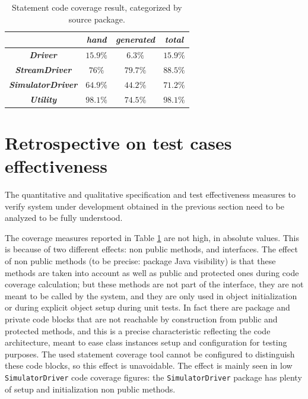\documentclass{article} \usepackage{times}
\newcommand{\lil}[1]{\texttt{\lstinline|#1|}}
\begin{document}
\begin{table}[htbp]
  \caption{Statement code coverage result, categorized by source package.}
  \label{tab:statement_code_coverage}
  \begin{center}
    \begin{tabular}{|c|c|c|c|}\hline
      & \textbf{\textit{hand}} & \textbf{\textit{generated}} &
      \textbf{\textit{total}} \\\hline
      \textbf{\textit{Driver}} & $15.9 \%$ & $6.3 \%$ & $15.9 \%$ \\\hline
      \textbf{\textit{StreamDriver}} & $76 \%$ & $79.7 \%$ & $88.5 \%$ \\\hline
      \textbf{\textit{SimulatorDriver}} & $64.9 \%$ & $44.2 \%$ &
      $71.2 \%$ \\\hline
      \textbf{\textit{Utility}} & $98.1 \%$ & $74.5 \%$ & $98.1 \%$ \\\hline
    \end{tabular}
  \end{center}
\end{table}



\section{Retrospective on test cases effectiveness}
\label{sec:test_cases_retrospectives}

The quantitative and qualitative specification and test effectiveness
measures to verify system under development obtained
in the previous section need to be analyzed to be fully understood.

The coverage measures reported in Table
\ref{tab:statement_code_coverage} are not high, in absolute
values. This is because of two different effects: non public methods,
and interfaces. The effect of non public methods (to be precise:
package Java visibility) is that these methods are taken into account
as well as public and protected ones during code coverage calculation;
but these methods are not part of the interface, they are not meant to
be called by the system, and they are only used in object
initialization or during explicit object setup during unit tests. In
fact there are package and private code blocks that are not reachable
by construction from public and protected methods, and this is a
precise characteristic reflecting the code architecture, meant to ease
class instances setup and configuration for testing purposes. The used
statement coverage tool cannot be configured to distinguish these code
blocks, so this effect is unavoidable. The effect is mainly seen in
low \lil{SimulatorDriver} code coverage figures: the
\lil{SimulatorDriver} package has plenty of setup and initialization
non public methods.
\end{document}
